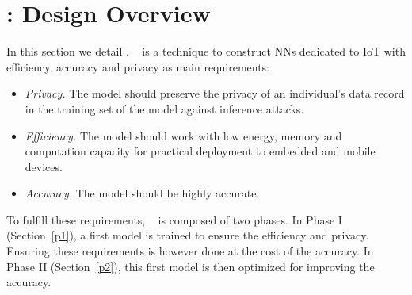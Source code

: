 \section{\method: Design Overview}\label{design}

In this section we detail \method\hspace{0.02in}.
\method~ is a technique to construct NNs dedicated to IoT with efficiency, accuracy and privacy as main requirements:

\begin{itemize}[leftmargin=*]

\item {\em Privacy.}
The model should preserve the privacy of an individual's data record in the training set of the model against inference attacks.

\item {\em Efficiency.}
The model should work with low energy, memory and computation capacity for practical deployment to embedded and mobile devices.

\item {\em Accuracy.}
The model should be highly accurate.
\end{itemize}


To fulfill these requirements, \method~ is composed of two phases.
In Phase I (Section~\ref{p1}), a first model is trained to ensure the efficiency and privacy. 
Ensuring these requirements is however done at the cost of the accuracy. 
In Phase II (Section~\ref{p2}), this first model is then optimized for improving the accuracy.





